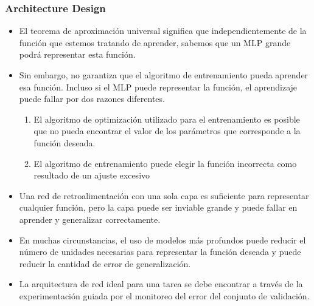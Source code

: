 \documentclass[
  shownotes,
  xcolor={svgnames},
  hyperref={colorlinks,citecolor=DarkBlue,linkcolor=DarkRed,urlcolor=DarkBlue}
  , aspectratio=169]{beamer}
\begin{document}
\begin{frame}
\frametitle{Architecture Design}

\begin{itemize}

    \item El teorema de aproximación universal significa que independientemente de la función que estemos tratando de aprender, sabemos que un MLP grande podrá representar esta función.
    \item Sin embargo, no garantiza que el algoritmo de entrenamiento pueda aprender esa función. Incluso si el MLP puede representar la función, el aprendizaje puede fallar por dos razones diferentes.
            \begin{enumerate}
                \item El algoritmo de optimización utilizado
                 para el entrenamiento es posible que no pueda encontrar el valor de los parámetros que corresponde
                 a la función deseada. 
                \item El algoritmo de entrenamiento puede elegir la función incorrecta como resultado de un ajuste excesivo
            \end{enumerate}


    \item Una red de retroalimentación con una sola capa es suficiente para representar cualquier función, pero la capa puede ser inviable grande y puede fallar en aprender y generalizar correctamente.

    \item  En muchas circunstancias, el uso de modelos más profundos puede reducir el número de unidades necesarias para representar la función deseada y puede reducir la cantidad de error de generalización.
    \item  La arquitectura de red ideal para una tarea se debe encontrar a través de la experimentación guiada por el monitoreo del error del conjunto de validación.
\end{itemize}
\end{frame}
\end{document}
